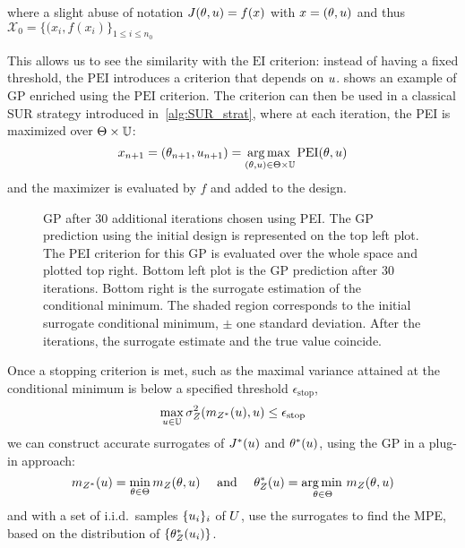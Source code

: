 \documentclass[../../Main_ManuscritThese.tex]{subfiles}
\newcommand\imgpath{/home/victor/acadwriting/Manuscrit/Text/Chapter4/img/}
\begin{document}
where a slight abuse of notation $J(\theta, u) = f(x)$ with
$x=(\theta, u)$ and thus
$\mathcal{X}_0 = \{(x_i, f(x_i)\}_{1\leq i\leq n_0}$

This allows us to see the similarity with the $\mathrm{EI}$
criterion: instead of having a fixed threshold, the $\mathrm{PEI}$
introduces a criterion that depends on $u$. 
shows an example of GP enriched using the $\mathrm{PEI}$ criterion.
The criterion can then be used in a classical SUR strategy introduced
in~\cref{alg:SUR_strat}, where at each iteration, the PEI is maximized
over $\Theta \times \mathbb{U}$:
\begin{equation}
  \label{eq:PEI_criterion_SUR}
  x_{n+1}=(\theta_{n+1}, u_{n+1}) =\operatorname*{arg\,max \,}_{(\theta, u)\in \Theta \times \mathbb{U}} \mathrm{PEI}(\theta, u)
\end{equation}
and the maximizer is evaluated by $f$ and added to the design.
\begin{figure}[ht]
  \centering
  
  \caption[Illustration of enrichment using the PEI
  criterion]{\label{fig:example_PEI} GP after 30 additional iterations
    chosen using PEI. The GP prediction using the initial design is
    represented on the top left plot. The PEI criterion for this
    GP is evaluated over the whole space and plotted top right. Bottom
    left plot is the GP prediction after 30 iterations. Bottom right
    is the surrogate estimation of the conditional minimum. The shaded
    region corresponds to the initial surrogate conditional minimum,
    $\pm$ one standard deviation. After the iterations, the surrogate
    estimate and the true value coincide.}
\end{figure}
Once a stopping criterion is met, such as the maximal variance
attained at the conditional minimum is below a specified threshold
$\epsilon_{\mathrm{stop}}$,
\begin{equation}
  \max_{u\in\mathbb{U}} \sigma^2_Z(m_{Z^*}(u), u) \leq \epsilon_{\mathrm{stop}}
\end{equation}
we can construct accurate surrogates of $J^*(u)$ and $\theta^*(u)$,
using the GP in a plug-in approach:
\begin{equation}
 m_{Z^*}(u) = \min_{\theta\in\Theta} m_Z(\theta,u)  \quad \text{ and } \quad \theta_Z^*(u) =\operatorname*{arg\,min \,}_{\theta\in\Theta} m_Z(\theta, u)
\end{equation}
and with a set of i.i.d.\ samples $\{u_i\}_i$ of $U$, use the
surrogates to find the MPE, based on the distribution of
$\{\theta_Z^*(u_i)\}$.
\end{document}
